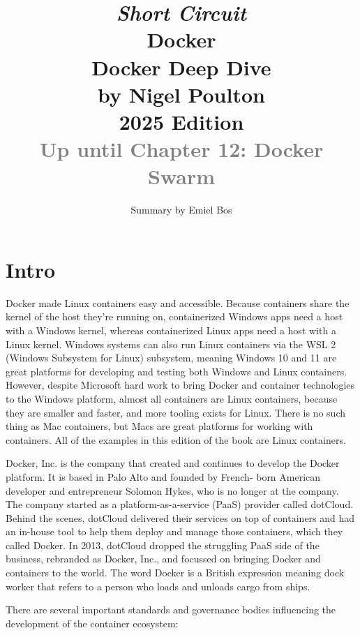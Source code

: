 \documentclass[table, xcdraw]{article}%
\title{
\textit{Short Circuit}\\
\vspace{15px}
\huge
Docker\\
\vspace{20px}
\large
Docker Deep Dive\\
by Nigel Poulton\\
2025 Edition\\
\textcolor{gray}{Up until Chapter 12: Docker Swarm}
}
\author{Summary by Emiel Bos}
\date{}
\begin{document}
\maketitle

\section{Intro}

Docker made Linux containers easy and accessible. Because containers share the kernel of the host they’re running on, containerized Windows apps need a host with a Windows kernel, whereas containerized Linux apps need a host with a Linux kernel. Windows systems can also run Linux containers via the WSL 2 (Windows Subsystem for Linux) subsystem, meaning Windows 10 and 11 are great platforms for developing and testing both Windows and Linux containers. However, despite Microsoft hard work to bring Docker and container technologies to the Windows platform, almost all containers are Linux containers, because they are smaller and faster, and more tooling exists for Linux. There is no such thing as Mac containers, but Macs are great platforms for working with containers. All of the examples in this edition of the book are Linux containers.

Docker, Inc. is the company that created and continues to develop the Docker platform. It is based in Palo Alto and founded by French-
born American developer and entrepreneur Solomon Hykes, who is no longer at the company. The company started as a platform-as-a-service (PaaS) provider called dotCloud. Behind the scenes, dotCloud delivered their services on top of containers and had an in-house tool to
help them deploy and manage those containers, which they called Docker. In 2013, dotCloud dropped the struggling PaaS side of the business, rebranded as Docker, Inc., and focussed on bringing Docker and containers to the world. The word Docker is a British expression meaning dock worker that refers to a person who loads and unloads cargo from ships.

There are several important standards and governance bodies influencing the development of the container ecosystem:
\end{document}

